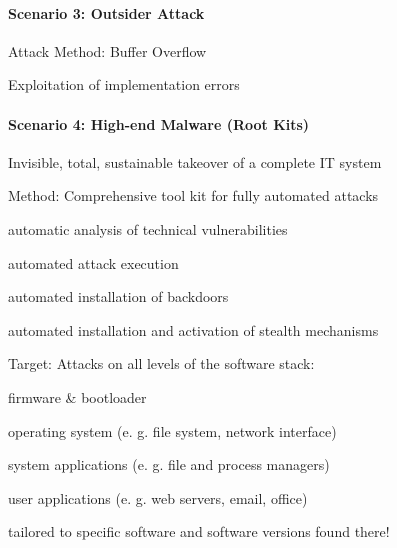 \documentclass[a4paper]{article}
\begin{document}
\begin{multicols}{3}
    \paragraph{Scenario 3: Outsider Attack}
    \begin{itemize*}
        \item Attack Method: Buffer Overflow
        \item Exploitation of implementation errors
    \end{itemize*}

    \paragraph{Scenario 4: High-end Malware (Root Kits)}
    \begin{itemize*}
        \item Invisible, total, sustainable takeover of a complete IT system
        \item Method: Comprehensive tool kit for fully automated attacks
        \begin{enumerate*}
            \item automatic analysis of technical vulnerabilities
            \item automated attack execution
            \item automated installation of backdoors
            \item automated installation and activation of stealth mechanisms
        \end{enumerate*}
        \item Target: Attacks on all levels of the software stack:
        \begin{itemize*}
            \item firmware \& bootloader
            \item operating system (e. g. file system, network interface)
            \item system applications (e. g. file and process managers)
            \item user applications (e. g. web servers, email, office)
        \end{itemize*}
        \item tailored to specific software and software versions found there!
    \end{itemize*}


\end{multicols}
\end{document}
